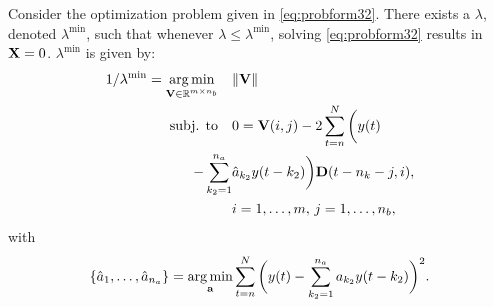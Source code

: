 \documentclass{ifacconf}
\DeclareMathOperator*\argmin{arg\,min}
\newcommand{\DD}{{\bf D}}
\renewcommand{\aa}{{\bf a}}
\newcommand{\X}{{\bf X}}
\newcommand{\0}{{\bf 0}}
\renewcommand{\a}{a}
\def\subjto{{\mbox{subj. to}}}
\renewcommand{\Re}{{\mathbb{R}}}
\begin{document}
  
\begin{thm}\hfill


Consider the optimization
problem given in
\eqref{eq:probform32}. There exists a $\lambda$, denoted
$\lambda^{\text{min}} $, such that whenever $\lambda\leq
\lambda^{\text{min}} $, solving \eqref{eq:probform32} results in
$\X=0$. $\lambda^{\text{min}} $ is given by:
\begin{subequations}\label{eqlambdamax}
\begin{align} 1/\lambda^{\text{min}}  =\argmin_{{\bf V}
    \in\Re^{m\times n_b}}  \quad &
  \|{\bf V}\| \\ \nonumber \subjto \quad & 0=  {\bf V }(i,j) - 2 \sum_{t=n}^N\bigg(
y(t)  \\ \label{eq:sip4}-\sum_{k_2=1}^{n_a} &\hat \a_{k_2} 
 y(t-k_2) \bigg) 
   \DD(t-n_k-j,i), \\ & i=1,\dots, m, \,j=1,\dots,n_b,
\end{align}
\end{subequations}with 
\begin{equation}
\{\hat a_1,\dots,\hat a_{n_a}\} = \argmin_{\aa}  \sum_{t=n}^N\bigg(
y(t)-\sum_{k_2=1}^{n_a} \a_{k_2}
 y(t-k_2) \bigg)^2.
\end{equation}
\end{thm}
\end{document}
